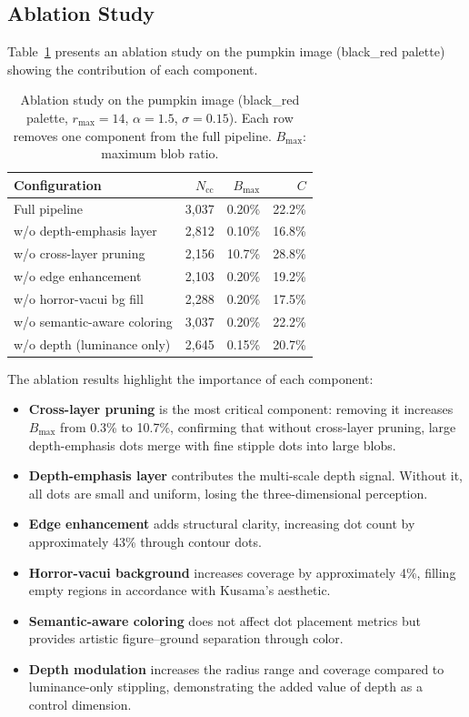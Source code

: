 \subsection{Ablation Study}

Table~\ref{tab:ablation} presents an ablation study on the pumpkin
image (black\_red palette) showing the contribution of each component.

\begin{table}[t]
\centering
\caption{Ablation study on the pumpkin image (black\_red palette,
$r_{\max}=14$, $\alpha=1.5$, $\sigma=0.15$). Each row removes one
component from the full pipeline. $B_{\max}$: maximum blob ratio.}
\label{tab:ablation}
\small
\begin{tabular}{lrrr}
\toprule
Configuration & $N_{\text{cc}}$ & $B_{\max}$ & $C$ \\
\midrule
Full pipeline                         & 3{,}037 & 0.20\% & 22.2\% \\
\quad w/o depth-emphasis layer        & 2{,}812 & 0.10\% & 16.8\% \\
\quad w/o cross-layer pruning         & 2{,}156 & 10.7\% & 28.8\% \\
\quad w/o edge enhancement            & 2{,}103 & 0.20\% & 19.2\% \\
\quad w/o horror-vacui bg fill        & 2{,}288 & 0.20\% & 17.5\% \\
\quad w/o semantic-aware coloring     & 3{,}037 & 0.20\% & 22.2\% \\
\quad w/o depth (luminance only)      & 2{,}645 & 0.15\% & 20.7\% \\
\bottomrule
\end{tabular}
\end{table}

The ablation results highlight the importance of each component:

\begin{itemize}
    \item \textbf{Cross-layer pruning} is the most critical component:
    removing it increases $B_{\max}$ from 0.3\% to 10.7\%, confirming
    that without cross-layer pruning, large depth-emphasis dots merge
    with fine stipple dots into large blobs.
    \item \textbf{Depth-emphasis layer} contributes the multi-scale
    depth signal. Without it, all dots are small and uniform, losing
    the three-dimensional perception.
    \item \textbf{Edge enhancement} adds structural clarity, increasing
    dot count by approximately 43\% through contour dots.
    \item \textbf{Horror-vacui background} increases coverage by
    approximately 4\%, filling empty regions in accordance with
    Kusama's aesthetic.
    \item \textbf{Semantic-aware coloring} does not affect dot
    placement metrics but provides artistic figure--ground separation
    through color.
    \item \textbf{Depth modulation} increases the radius range and
    coverage compared to luminance-only stippling, demonstrating the
    added value of depth as a control dimension.
\end{itemize}
